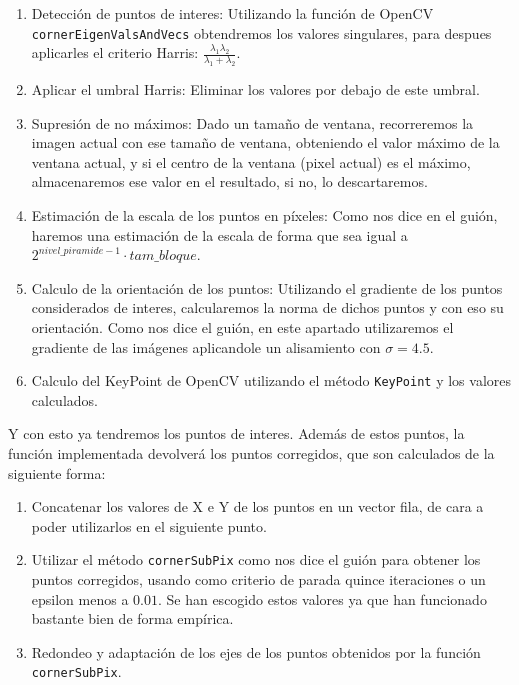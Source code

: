 \documentclass[12pt, spanish]{article}
\begin{document}
\begin{enumerate}
	\item Detección de puntos de interes: Utilizando la función de OpenCV \texttt{cornerEigenValsAndVecs}\cite{cornerCV} obtendremos los valores singulares, para despues aplicarles el criterio Harris: $\frac{\lambda_{1} \lambda_{2}}{\lambda_{1} + \lambda_{2}}$.
	\item Aplicar el umbral Harris: Eliminar los valores por debajo de este umbral.
	\item Supresión de no máximos: Dado un tamaño de ventana, recorreremos la imagen actual con ese tamaño de ventana, obteniendo el valor máximo de la ventana actual, y si el centro de la ventana (pixel actual) es el máximo, almacenaremos ese valor en el resultado, si no, lo descartaremos.
	\item Estimación de la escala de los puntos en píxeles: Como nos dice en el guión, haremos una estimación de la escala de forma que sea igual a $2^{nivel\_piramide - 1} \cdot tam\_bloque$.
	\item Calculo de la orientación de los puntos: Utilizando el gradiente de los puntos considerados de interes, calcularemos la norma de dichos puntos y con eso su orientación. Como nos dice el guión, en este apartado utilizaremos el gradiente de las imágenes aplicandole un alisamiento con $\sigma = 4.5$.
	\item Calculo del KeyPoint de OpenCV utilizando el método \texttt{KeyPoint}\cite{keypoint} y los valores calculados.
\end{enumerate}

Y con esto ya tendremos los puntos de interes. Además de estos puntos, la función implementada devolverá los puntos corregidos, que son calculados de la siguiente forma:

\begin{enumerate}
	\item Concatenar los valores de X e Y de los puntos en un vector fila, de cara a poder utilizarlos en el siguiente punto.
	\item Utilizar el método \texttt{cornerSubPix}\cite{cornerSubPix} como nos dice el guión para obtener los puntos corregidos, usando como criterio de parada quince iteraciones o un epsilon menos a $0.01$. Se han escogido estos valores ya que han funcionado bastante bien de forma empírica.
	\item Redondeo y adaptación de los ejes de los puntos obtenidos por la función \texttt{cornerSubPix}.
\end{enumerate}
\end{document}
